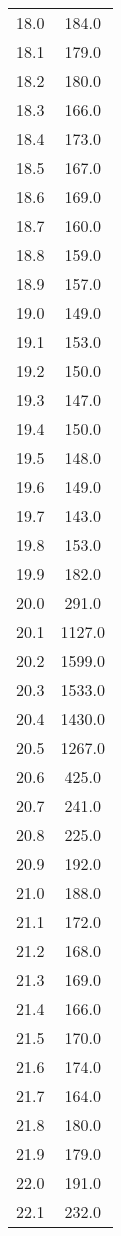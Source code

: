 \begin{table}
\begin{tabular}{c c}
        18.0	&	184.0\\
        18.1	&	179.0\\
        18.2	&	180.0\\
        18.3	&	166.0\\
        18.4	&	173.0\\
        18.5	&	167.0\\
        18.6	&	169.0\\
        18.7	&	160.0\\
        18.8	&	159.0\\
        18.9	&	157.0\\
        19.0	&	149.0\\
        19.1	&	153.0\\
        19.2	&	150.0\\
        19.3	&	147.0\\
        19.4	&	150.0\\
        19.5	&	148.0\\
        19.6	&	149.0\\
        19.7	&	143.0\\
        19.8	&	153.0\\
        19.9	&	182.0\\
        20.0	&	291.0\\
        20.1	&	1127.0\\
        20.2	&	1599.0\\
        20.3	&	1533.0\\
        20.4	&	1430.0\\
        20.5	&	1267.0\\
        20.6	&	425.0\\
        20.7	&	241.0\\
        20.8	&	225.0\\
        20.9	&	192.0\\
        21.0	&	188.0\\
        21.1	&	172.0\\
        21.2	&	168.0\\
        21.3	&	169.0\\
        21.4	&	166.0\\
        21.5	&	170.0\\
        21.6	&	174.0\\
        21.7	&	164.0\\
        21.8	&	180.0\\
        21.9	&	179.0\\
        22.0	&	191.0\\
        22.1	&	232.0\\

\end{tabular}
\end{table}
